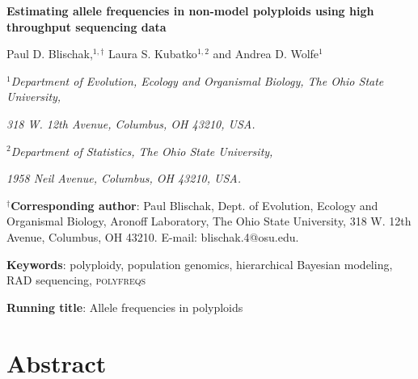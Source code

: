 \documentclass[11pt,english,letterpaper,oneside]{article}
\begin{document}
\newcommand{\tmat}{$\bm{T}$}
\newcommand{\rmat}{$\bm{R}$}

\vspace*{0.25in}

\begin{center}

{\Large \textbf{Estimating allele frequencies in non-model polyploids using high throughput sequencing data}}
\vspace{0.45in}

Paul D. Blischak,$^{1,\dagger}$ Laura S. Kubatko$^{1,2}$ and Andrea D. Wolfe$^1$
\vspace{0.45in}


\textit{$^1$Department of Evolution, Ecology and Organismal Biology, The Ohio State University,}

\textit{318 W. 12th Avenue, Columbus, OH 43210, USA.}
\bigskip
\bigskip

\textit{$^2$Department of Statistics, The Ohio State University,}

\textit{1958 Neil Avenue, Columbus, OH 43210, USA.}


\end{center}
\vspace{0.45in}


\noindent $^\dagger$\textbf{Corresponding author}: Paul Blischak, Dept. of Evolution, Ecology and Organismal Biology, Aronoff Laboratory, The Ohio State University, 318 W. 12th Avenue, Columbus, OH 43210. E-mail: blischak.4@osu.edu.
\vspace{0.45in}

\noindent \textbf{Keywords}: polyploidy, population genomics, hierarchical Bayesian modeling, RAD sequencing, \textsc{polyfreqs}
\vspace{0.45in}

\noindent \textbf{Running title}: Allele frequencies in polyploids

\vfill

\section*{Abstract}                      %
\end{document}
